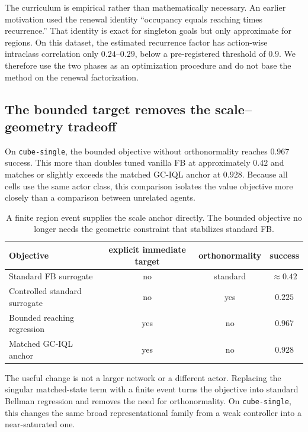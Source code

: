\documentclass{article}
\begin{document}
The curriculum is empirical rather than mathematically necessary. An earlier
motivation used the renewal identity ``occupancy equals reaching times
recurrence.'' That identity is exact for singleton goals but only approximate for
regions. On this dataset, the estimated recurrence factor has action-wise
intraclass correlation only $0.24$--$0.29$, below a pre-registered threshold of
$0.9$. We therefore use the two phases as an optimization procedure and do not
base the method on the renewal factorization.

\subsection{The bounded target removes the scale--geometry tradeoff}

On \texttt{cube-single}, the bounded objective without orthonormality reaches
$0.967$ success. This more than doubles tuned vanilla FB at approximately $0.42$
and matches or slightly exceeds the matched GC-IQL anchor at $0.928$. Because all
cells use the same actor class, this comparison isolates the value objective more
closely than a comparison between unrelated agents.

\begin{table}[t]
\centering\small
\begin{tabular}{l c c c}
\toprule
Objective & explicit immediate target & orthonormality & success \\
\midrule
Standard FB surrogate & no & standard & $\approx0.42$ \\
Controlled standard surrogate & no & yes & $0.225$ \\
Bounded reaching regression & yes & no & $\mathbf{0.967}$ \\
Matched GC-IQL anchor & yes & no & $0.928$ \\
\bottomrule
\end{tabular}
\caption{A finite region event supplies the scale anchor directly. The bounded
objective no longer needs the geometric constraint that stabilizes standard FB.}
\label{tab:bounded-main}
\end{table}

\begin{finding}
The useful change is not a larger network or a different actor. Replacing the
singular matched-state term with a finite event turns the objective into standard
Bellman regression and removes the need for orthonormality. On
\texttt{cube-single}, this changes the same broad representational family from a
weak controller into a near-saturated one.
\end{finding}
\end{document}
